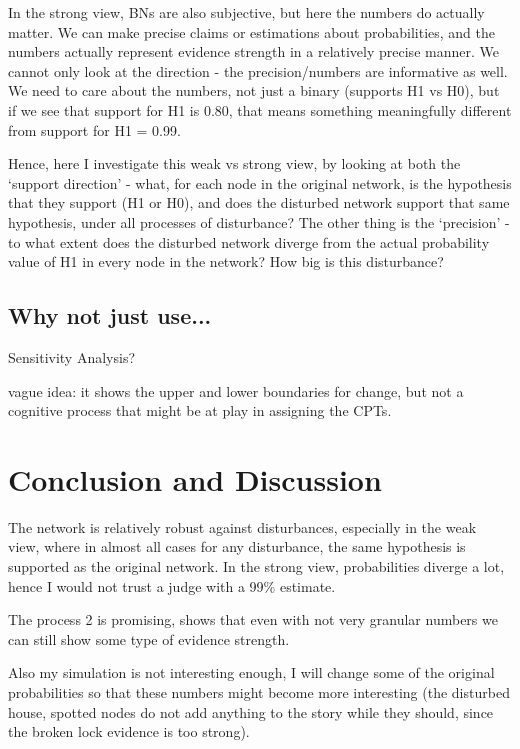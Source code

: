 \documentclass[11pt]{amsart}
\begin{document}
In the strong view, BNs are also subjective, but here the numbers do actually matter. We can make precise claims or estimations about probabilities, and the numbers actually represent evidence strength in a relatively precise manner. We cannot only look at the direction - the precision/numbers are informative as well. We need to care about the numbers, not just a binary (supports H1 vs H0), but if we see that support for H1 is 0.80, that means something meaningfully different from support for H1 = 0.99.

Hence, here I investigate this weak vs strong view, by looking at both the `support direction' - what, for each node in the original network, is the hypothesis that they support (H1 or H0), and does the disturbed network support that same hypothesis, under all processes of disturbance?
The other thing is the `precision' - to what extent does the disturbed network diverge from the actual probability value of H1 in every node in the network? How big is this disturbance?

\subsection{Why not just use...}
Sensitivity Analysis?

vague idea: it shows the upper and lower boundaries for change, but not a cognitive process that might be at play in assigning the CPTs.

\section{Conclusion and Discussion}

The network is relatively robust against disturbances, especially in the weak view, where in almost all cases for any disturbance, the same hypothesis is supported as the original network. In the strong view, probabilities diverge a lot, hence I would not trust a judge with a 99\% estimate.

The process 2 is promising, shows that even with not very granular numbers we can still show some type of evidence strength. 

Also my simulation is not interesting enough, I will change some of the original probabilities so that these numbers might become more interesting (the disturbed house, spotted nodes do not add anything to the story while they should, since the broken lock evidence is too strong).

\clearpage
\end{document}
